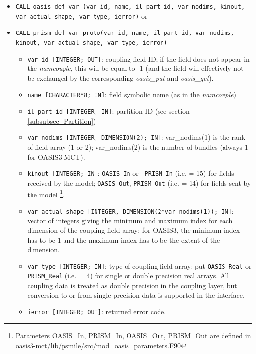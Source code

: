 \begin{itemize}

\item {\tt CALL oasis\_def\_var       (var\_id, name, il\_part\_id,
  var\_nodims, kinout, \newline var\_actual\_shape, var\_type, ierror)} or

\item {\tt CALL prism\_def\_var\_proto(var\_id, name, il\_part\_id,
  var\_nodims, kinout, var\_actual\_shape, var\_type, ierror)}


\begin{itemize}
 \item {\tt var\_id [INTEGER; OUT]}: coupling field ID; if the field does not appear in the {\it namcouple}, this will be equal to -1 (and the field will effectively not be exchanged by the corresponding {\it oasis\_put} and {\it oasis\_get}).
 \item {\tt name [CHARACTER*8; IN]}: field symbolic name (as in the
   {\it namcouple})
 \item {\tt il\_part\_id [INTEGER; IN]}: partition ID (see section \ref{subsubsec_Partition})
 \item {\tt var\_nodims [INTEGER, DIMENSION(2); IN]}: var\_nodims(1) is
   the rank of field array (1 or 2); var\_nodims(2) is the number of
   bundles (always 1 for OASIS3-MCT). 
 \item {\tt kinout [INTEGER; IN]}: {\tt OASIS\_In} or {\tt
   PRISM\_In} (i.e. = 15) for fields received by
   the model; {\tt OASIS\_Out}, {\tt PRISM\_Out} (i.e. = 14) for
   fields sent by the model
\footnote{Parameters OASIS\_In,
   PRISM\_In, OASIS\_Out, PRISM\_Out are defined in oasis3-mct/lib/psmile/src/mod\_oasis\_parameters.F90}.
 \item {\tt var\_actual\_shape [INTEGER, DIMENSION(2*var\_nodims(1)); IN]}: 
   vector of integers giving the minimum and maximum index for each
   dimension of the coupling field array; for OASIS3, the minimum
   index has to be 1 and the maximum index has to be the extent of the
   dimension.
 \item {\tt var\_type [INTEGER; IN]}: type of coupling field array;
   put {\tt OASIS\_Real} or {\tt PRISM\_Real} (i.e. = 4) for single or double precision real
   arrays.  All coupling data is treated as double precision in the
   coupling layer, but conversion to or from single precision data
   is supported in the interface.
 \item {\tt ierror [INTEGER; OUT]}: returned error code. 
\end{itemize}
\end{itemize}

